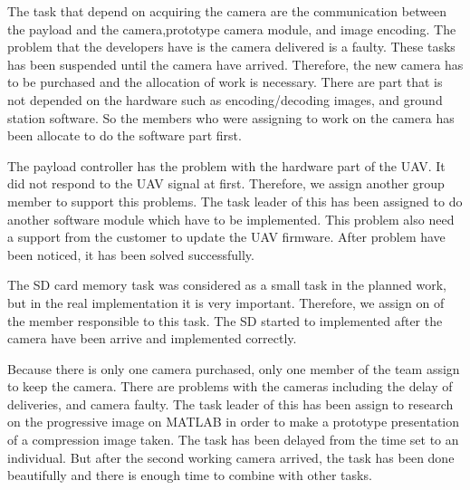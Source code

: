 The task that depend on acquiring the camera are the communication between the payload and the camera,prototype camera module, and image encoding. 
The problem that the developers have is the camera delivered is a faulty.
These tasks has been suspended until the camera have arrived.  
Therefore, the new camera has to be purchased and the allocation of work is necessary. 
There are part that is not depended on the hardware such as encoding/decoding images, and ground station software. 
So the members who were assigning to work on the camera has been allocate to do the software part first.

The payload controller has the problem with the hardware part of the UAV. 
It did not respond to the UAV signal at first. 
Therefore, we assign another group member to support this problems. 
The task leader of this has been assigned to do another software module which have to be implemented. 
This problem also need a support from the customer to update the UAV firmware. 
After problem have been noticed, it has been solved successfully. 

The SD card memory task was considered as a small task in the planned work, but in the real implementation it is very important. 
Therefore, we assign on of the member responsible to this task. 
The SD started to implemented after the camera have been arrive and implemented correctly. 

Because there is only one camera purchased, only one member of the team assign to keep the camera. 
There are problems with the cameras including the delay of deliveries, and camera faulty. 
The task leader of this has been assign to research on the progressive image on MATLAB in order to make a prototype presentation of a compression image taken. 
The task has been delayed from the time set to an individual. 
But after the second working camera arrived, the task has been done beautifully and there is enough time to combine with other tasks.